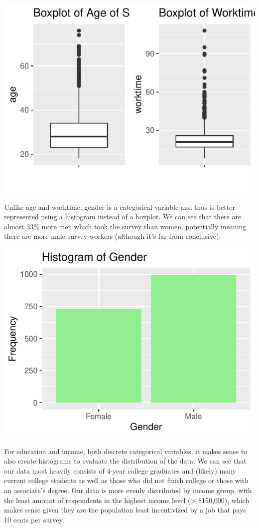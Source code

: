 \documentclass[
]{article}
\begin{document}
\includegraphics{hw1_sp2022_files/figure-latex/unnamed-chunk-10-1.pdf}

Unlike age and worktime, gender is a categorical variable and thus is
better represented using a histogram instead of a boxplot. We can see
that there are almost 33\% more men which took the survey than women,
potentially meaning there are more male survey workers (although it's
far from conclusive).

\includegraphics{hw1_sp2022_files/figure-latex/unnamed-chunk-11-1.pdf}

For education and income, both discrete categorical variables, it makes
sense to also create histograms to evaluate the distribution of the
data. We can see that our data most heavily consists of 4-year college
graduates and (likely) many current college students as well as those
who did not finish college or those with an associate's degree. Our data
is more evenly distributed by income group, with the least amount of
respondents in the highest income level (\textgreater{} \$150,000),
which makes sense given they are the population least incentivized by a
job that pays 10 cents per survey.
\end{document}
